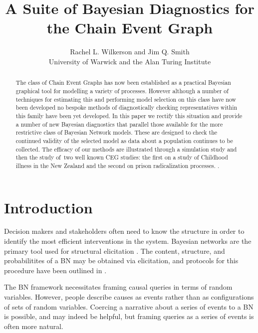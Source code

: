 \documentclass[12pt]{article}
\begin{document}
\title{A Suite of Bayesian Diagnostics for the Chain Event Graph}
\author{Rachel L. Wilkerson and Jim Q. Smith \\
University of Warwick and the Alan Turing Institute}
\maketitle

\begin{abstract}
The class of Chain Event Graphs has now been established as a practical
Bayesian graphical tool for modelling a variety of processes. However
although a number of techniques for estimating this and performing model
selection on this class have now been developed no bespoke methods of
diagnostically checking representatives within this family have been yet
developed. In this paper we rectify this situation and provide a number of
new Bayesian diagnostics that parallel those available for the more
restrictive class of Bayesian Network models. These are designed to check
the continued validity of the selected model as data about a population
continues to be collected. The efficacy of our methods are illustrated
through a simulation study and then the study of\ two well known CEG
studies: the first on a study of Childhood illness in the New Zealand and
the second on prison radicalization processes.      .
\end{abstract}

\section{Introduction }

Decision makers and stakeholders often need to know the structure in order to identify the most efficient interventions in the system. Bayesian networks are the primary tool used for structural elicitation \cite{Lord2016,Pitchforth2013}. The content, structure, and probabilitites of a BN may be obtained via elicitation, and protocols for this procedure have been outlined in \cite{EFSA} \cite{Ohagan}. 

The BN framework necessitates framing causal queries in terms of random variables. However, people describe causes as events rather than as configurations of sets of random variables. Coercing a narrative about a series of events to a BN is possible, and may indeed be helpful, but framing queries as a series of events is often more natural. 

\end{document}
